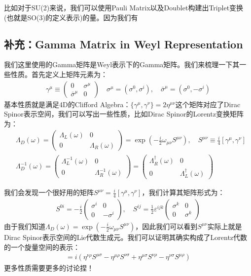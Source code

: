 比如对于SU(2)来说，我们可以使用Pauli Matrix以及Doublet构建出Triplet变换(也就是SO(3)的定义表示)的量。因为我们有

\subsection{补充：Gamma Matrix in Weyl Representation}


我们这里使用的Gamma矩阵是Weyl表示下的Gamma矩阵。我们来梳理一下其一些性质。首先定义上矩阵元素为：
\begin{align}
  \gamma^{\mu}\equiv
  \begin{pmatrix}0&\sigma^{\mu}\\\bar{\sigma}^{\mu}&0
  \end{pmatrix} \quad \sigma^{\mu}=(\sigma^0,\sigma^i),\quad
  \bar{\sigma}^{\mu}=(\sigma^0,-\sigma^i)
\end{align}
基本性质就是满足4D的Clifford Algebra：$
\{\gamma^{\mu},\gamma^{\nu}\}=2\eta^{\mu\nu} $这个矩阵对应了Dirac
Spinor表示空间，我们可以写出一些性质，比如Dirac Spinor的Lorentz变换矩阵为：
\begin{align}
  &\Lambda_{D}(\omega)=
  \begin{pmatrix}\Lambda_{L}(\omega)&0\\0&\Lambda_{R}(\omega)
  \end{pmatrix}=\exp\left(-\frac{i}{2}\omega_{\mu\nu}S^{\mu\nu}\right)
  , \quad S^{\mu\nu}\equiv\frac{i}{4}[\gamma^{\mu},\gamma^{\nu}]  \\
  &\Lambda_D^{-1}(\omega)=
  \begin{pmatrix}\Lambda_{L}^{-1}(\omega)&0\\0&\Lambda_{R}^{-1}(\omega)
  \end{pmatrix}=
  \begin{pmatrix}\Lambda_{R}^\dagger(\omega)&0\\0&\Lambda_{L}^\dagger(\omega)
  \end{pmatrix}
\end{align}

\bigskip
{}

我们会发现一个很好用的矩阵$ S^{\mu\nu} = \frac{i}{4}[\gamma^\mu,\gamma^\nu] $，我们计算其矩阵形式为：
\begin{align}
  S^{0i}=-\frac{i}{2}
  \begin{pmatrix}\sigma^i&0\\0&-\sigma^i
  \end{pmatrix},\quad S^{ij}=\frac{1}{2}\varepsilon^{ijk}
  \begin{pmatrix}\sigma^k&0\\0&\sigma^k
  \end{pmatrix}
\end{align}
由于我们知道$
\Lambda_D(\omega)=\exp\left(-\frac{i}{2}\omega_{\mu\nu}S^{\mu\nu}\right)
$，因此我们可以看到$ S^{\mu\nu} $实际上就是Dirac
Spinor表示空间的Lie代数生成元。我们可以证明其确实构成了Lorentz代数的一个旋量空间的表示：
\begin{align}
  [S^{\mu\nu},S^{\rho\sigma}]=i(\eta^{\nu\rho}S^{\mu\sigma}-\eta^{\mu\rho}S^{\nu\sigma}+\eta^{\mu\sigma}S^{\nu\rho}-\eta^{\nu\sigma}S^{\mu\rho})
\end{align}
更多性质需要更多的讨论捏！


